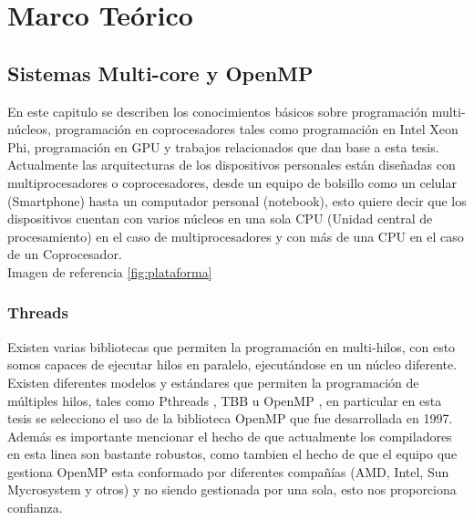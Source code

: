 \chapter[Marco Teórico]{\label{ch:marco-teorico}Marco Teórico}

\section{Sistemas Multi-core y OpenMP}

En este capitulo se describen los conocimientos básicos sobre programación multi-núcleos, programación en coprocesadores tales como programación en Intel Xeon Phi, programación en GPU y trabajos relacionados que dan base a esta tesis.\\
Actualmente las arquitecturas de los dispositivos personales están diseñadas con multiprocesadores o coprocesadores, desde un equipo de bolsillo como un celular (Smartphone) hasta un computador personal (notebook), esto quiere decir que los dispositivos cuentan con varios núcleos en una sola CPU (Unidad central de procesamiento) en el caso de multiprocesadores y con más de una CPU en el caso de un Coprocesador.\\ Imagen de referencia \ref{fig:plataforma}

\subsection{Threads}
Existen varias bibliotecas que permiten la programación en multi-hilos, con esto somos capaces de ejecutar hilos en paralelo, ejecutándose en un núcleo diferente.\\
Existen diferentes modelos y estándares que permiten la programación de múltiples hilos, tales como Pthreads \cite{libroPthreads}, TBB \cite{libroTBB} u OpenMP \cite{libroOpenMP}, en particular en esta tesis se selecciono el uso de la biblioteca OpenMP que fue desarrollada en 1997. Además es importante mencionar el hecho de que actualmente los compiladores en esta linea son bastante robustos, como tambien el hecho de que el equipo que gestiona OpenMP esta conformado por diferentes compañías (AMD, Intel, Sun Mycrosystem y otros) y no siendo gestionada por una sola, esto nos proporciona confianza.\\

